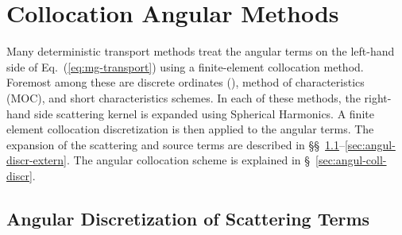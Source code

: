 \documentclass{article}
\numberwithin{equation}{subsection}
\begin{document}

\chapter{Collocation Angular Methods}
\label{cha:coll-angul-meth}

Many deterministic transport methods treat the angular terms on the left-hand
side of Eq.~(\ref{eq:mg-transport}) using a finite-element collocation method.
Foremost among these are discrete ordinates (\Sn), method of characteristics
(MOC), and short characteristics schemes. In each of these methods, the
right-hand side scattering kernel is expanded using Spherical Harmonics.  A
finite element collocation discretization is then applied to the angular
terms. The expansion of the scattering and source terms are described in
\S\S~\ref{sec:angul-discr-scatt-1}--\ref{sec:angul-discr-extern}.  The angular
collocation scheme is explained in \S~\ref{sec:angul-coll-discr}.

\section{Angular Discretization of Scattering Terms}
\label{sec:angul-discr-scatt-1}
\end{document}

